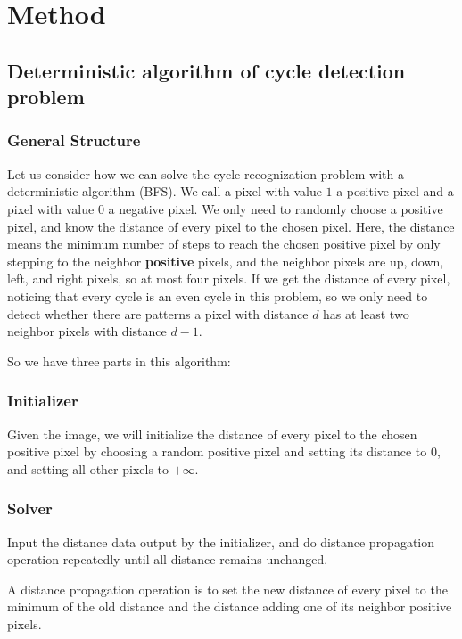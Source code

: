 \documentclass{article}
\begin{document}
\section{Method}

\subsection{Deterministic algorithm of cycle detection problem}

\subsubsection{General Structure}

Let us consider how we can solve the cycle-recognization problem with a deterministic algorithm (BFS).
We call a pixel with value $1$ a positive pixel and a pixel with value $0$ a negative pixel.  
We only need to randomly choose a positive pixel, and know the distance of every pixel to the chosen pixel. 
Here, the distance means the minimum number of steps to reach the chosen positive pixel by only stepping to the neighbor \textbf{positive} pixels, 
and the neighbor pixels are up, down, left, and right pixels, so at most four pixels.
If we get the distance of every pixel, noticing that every cycle is an even cycle in this problem, 
so we only need to detect whether there are patterns a pixel with distance $d$ has at least two neighbor pixels with distance $d-1$.

So we have three parts in this algorithm:

\subsubsection{Initializer}

Given the image, we will initialize the distance of every pixel to the chosen positive pixel by 
choosing a random positive pixel and setting its distance to $0$, and setting all other pixels to $+\infty$.

\subsubsection{Solver}

Input the distance data output by the initializer, 
and do distance propagation operation repeatedly until all distance remains unchanged. 

A distance propagation operation is to set the new distance of every pixel to the minimum of the old distance and the distance adding one of its neighbor positive pixels.
\end{document}
